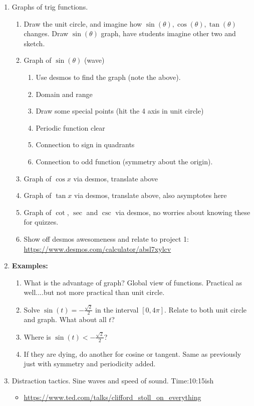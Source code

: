\documentclass{article}
\begin{document}
\begin{enumerate}
\item Graphs of trig functions. 
\begin{enumerate}
\item Draw the unit circle, and imagine how $\sin(\theta), \cos(\theta), \tan(\theta)$ changes. Draw $\sin(\theta)$ graph, have students imagine other two and sketch.
\item Graph of $\sin(\theta)$ (wave)
\begin{enumerate}
\item Use desmos to find the graph (note the above).
\item Domain and range
\item Draw some special points (hit the 4 axis in unit circle)
\item Periodic function clear
\item Connection to sign in quadrants
\item Connection to odd function (symmetry about the origin).
\end{enumerate}
\item Graph of $\cos x$ via desmos, translate above
\item Graph of $\tan x$ via desmos, translate above, also asymptotes here
\item Graph of $\cot$, $\sec$ and $\csc$ via desmos, no worries about knowing these for quizzes.
\item Show off desmos awesomeness and relate to project 1: \url{https://www.desmos.com/calculator/absl7xylcv}
\end{enumerate}

\item {\bf Examples: }
\begin{enumerate}
\item What is the advantage of graph? Global view of functions. Practical as well....but not more practical than unit circle.
\item Solve $\sin(t) = -\frac{\sqrt{2}}{2}$ in the interval $[0,4\pi]$. Relate to both unit circle and graph. What about all $t$?
\item Where is $\sin(t) < -\frac{\sqrt{2}}{2}$?
\item If they are dying, do another for cosine or tangent. Same as previously just with symmetry and periodicity added.
\end{enumerate}

\item Distraction tactics. Sine waves and speed of sound. Time:10:15ish
\begin{itemize}
\item \url{https://www.ted.com/talks/clifford_stoll_on_everything}
\end{itemize}



\end{enumerate}
\end{document}
